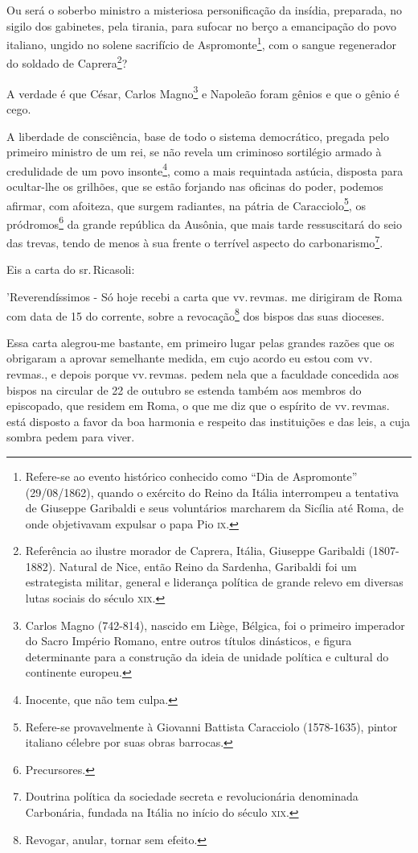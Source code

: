 Ou será o soberbo ministro a misteriosa personificação da insídia,
preparada, no sigilo dos gabinetes, pela tirania, para sufocar no berço
a emancipação do povo italiano, ungido no solene sacrifício de
Aspromonte\footnote{Refere-se ao evento histórico conhecido como ``Dia
  de Aspromonte'' (29/08/1862), quando o exército do Reino da Itália
  interrompeu a tentativa de Giuseppe Garibaldi e seus voluntários
  marcharem da Sicília até Roma, de onde objetivavam expulsar o papa Pio
  \textsc{ix}.}, com o sangue regenerador do soldado de Caprera\footnote{
  Referência ao ilustre morador de Caprera, Itália, Giuseppe Garibaldi
  (1807-1882). Natural de Nice, então Reino da Sardenha, Garibaldi foi
  um estrategista militar, general e liderança política de grande relevo
  em diversas lutas sociais do século \textsc{xix}.}?

A verdade é que César, Carlos Magno\footnote{Carlos Magno (742-814),
  nascido em Liège, Bélgica, foi o primeiro imperador do Sacro Império
  Romano, entre outros títulos dinásticos, e figura determinante para a
  construção da ideia de unidade política e cultural do continente
  europeu.} e Napoleão foram gênios e que o gênio é cego.

A liberdade de consciência, base de todo o sistema democrático, pregada
pelo primeiro ministro de um rei, se não revela um criminoso sortilégio
armado à credulidade de um povo insonte\footnote{Inocente, que não tem
  culpa.}, como a mais requintada astúcia, disposta para ocultar-lhe os
grilhões, que se estão forjando nas oficinas do poder, podemos afirmar,
com afoiteza, que surgem radiantes, na pátria de Caracciolo\footnote{
  Refere-se provavelmente à Giovanni Battista Caracciolo (1578-1635),
  pintor italiano célebre por suas obras barrocas.}, os
pródromos\footnote{Precursores.} da grande república da Ausônia, que
mais tarde ressuscitará do seio das trevas, tendo de menos à sua frente
o terrível aspecto do carbonarismo\footnote{Doutrina política da
  sociedade secreta e revolucionária denominada Carbonária, fundada na
  Itália no início do século \textsc{xix}.}.

Eis a carta do sr.\,Ricasoli:

'Reverendíssimos - Só hoje recebi a carta que vv.\,revmas. me dirigiram
de Roma com data de 15 do corrente, sobre a revocação\footnote{
  Revogar, anular, tornar sem efeito.} dos bispos das suas dioceses.

Essa carta alegrou-me bastante, em primeiro lugar pelas grandes razões
que os obrigaram a aprovar semelhante medida, em cujo acordo eu estou
com vv.\,revmas., e depois porque vv.\,revmas. pedem nela que a faculdade
concedida aos bispos na circular de 22 de outubro se estenda também aos
membros do episcopado, que residem em Roma, o que me diz que o espírito
de vv.\,revmas. está disposto a favor da boa harmonia e respeito das
instituições e das leis, a cuja sombra pedem para viver.

